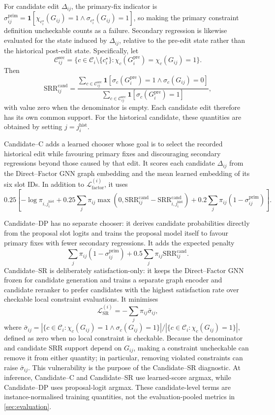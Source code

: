 \documentclass[a4paper,UKenglish,cleveref,autoref,thm-restate]{tgdk-v2021}
\newcommand{\Gpre}{G_i^{\mathrm{pre}}}
\begin{document}
For candidate edit \(\Delta_{ij}\), the primary-fix indicator is \(\sigma_{ij}^{\mathrm{prim}}=\mathbf{1}[\chi_{c_i^\star}(G_{ij})=1\land \sigma_{c_i^\star}(G_{ij})=1]\), so making the primary constraint definition uncheckable counts as a failure. Secondary regression is likewise evaluated for the state induced by \(\Delta_{ij}\), relative to the pre-edit state rather than the historical post-edit state. Specifically, let
\[
\mathcal{C}_{ij}^{\mathrm{sec}}=
\{c\in\mathcal{C}_i\setminus\{c_i^\star\}:
\chi_c(\Gpre)=\chi_c(G_{ij})=1\}.
\]
Then
\[
\mathrm{SRR}_{ij}^{\mathrm{cand}}=
\frac{
\sum_{c\in\mathcal{C}_{ij}^{\mathrm{sec}}}
\mathbf{1}[\sigma_c(\Gpre)=1\land \sigma_c(G_{ij})=0]
}{
\sum_{c\in\mathcal{C}_{ij}^{\mathrm{sec}}}
\mathbf{1}[\sigma_c(\Gpre)=1]
},
\]
with value zero when the denominator is empty. Each candidate edit therefore has its own common support. For the historical candidate, these quantities are obtained by setting \(j=j_i^{\mathrm{hist}}\).

Candidate--C adds a learned chooser whose goal is to select the recorded historical edit while favouring primary fixes and discouraging secondary regressions beyond those caused by that edit. It scores each candidate \(\Delta_{ij}\) from the Direct--Factor GNN graph embedding and the mean learned embedding of its six slot IDs. In addition to \(\mathcal{L}_{\mathrm{factor}}^{(i)}\), it uses
\[
0.25\!\left[
-\log \pi_{i,j_i^{\mathrm{hist}}}
+0.25\sum_j \pi_{ij}\max\!\left(
0,
\mathrm{SRR}_{ij}^{\mathrm{cand}}-
\mathrm{SRR}_{i,j_i^{\mathrm{hist}}}^{\mathrm{cand}}
\right)
+0.2\sum_j \pi_{ij}(1-\sigma_{ij}^{\mathrm{prim}})
\right].
\]

Candidate--DP has no separate chooser: it derives candidate probabilities directly from the proposal slot logits and trains the proposal model itself to favour primary fixes with fewer secondary regressions. It adds the expected penalty
\[
\sum_j\pi_{ij}(1-\sigma_{ij}^{\mathrm{prim}})
+0.5\sum_j\pi_{ij}\mathrm{SRR}_{ij}^{\mathrm{cand}}.
\]
Candidate--SR is deliberately satisfaction-only: it keeps the Direct--Factor GNN frozen for candidate generation and trains a separate graph encoder and candidate reranker to prefer candidates with the highest satisfaction rate over checkable local constraint evaluations. It minimises
\[
\mathcal{L}_{\mathrm{SR}}^{(i)}=-\sum_j\pi_{ij}\bar\sigma_{ij},
\]
where \(\bar\sigma_{ij}=|\{c\in\mathcal{C}_i:\chi_c(G_{ij})=1\land \sigma_c(G_{ij})=1\}|/|\{c\in\mathcal{C}_i:\chi_c(G_{ij})=1\}|\), defined as zero when no local constraint is checkable. Because the denominator and candidate SRR support depend on \(G_{ij}\), making a constraint uncheckable can remove it from either quantity; in particular, removing violated constraints can raise \(\bar\sigma_{ij}\). This vulnerability is the purpose of the Candidate--SR diagnostic. At inference, Candidate--C and Candidate--SR use learned-score argmax, while Candidate--DP uses proposal-logit argmax. These candidate-level terms are instance-normalised training quantities, not the evaluation-pooled metrics in \cref{sec:evaluation}.
\end{document}
